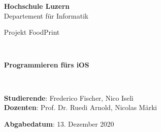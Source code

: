 \documentclass[12pt,titlepage]{article}
\begin{document}
\thispagestyle{empty}

\begin{center}
\textbf{Hochschule Luzern}\\
Departement für Informatik\\[12\baselineskip]

\begin{Huge}
Projekt FoodPrint
\end{Huge} \\[6\baselineskip]

\begin{large}
\textbf{Programmieren fürs iOS}
\end{large} \\[6\baselineskip]

\begin{large}
\textbf{Studierende}: Frederico Fischer, Nico Iseli\\
\textbf{Dozenten}: Prof. Dr. Ruedi Arnold, Nicolas Märki\

\textbf{Abgabedatum}: 13. Dezember 2020 \\[3\baselineskip]


\end{large}
\end{center}
\end{document}
